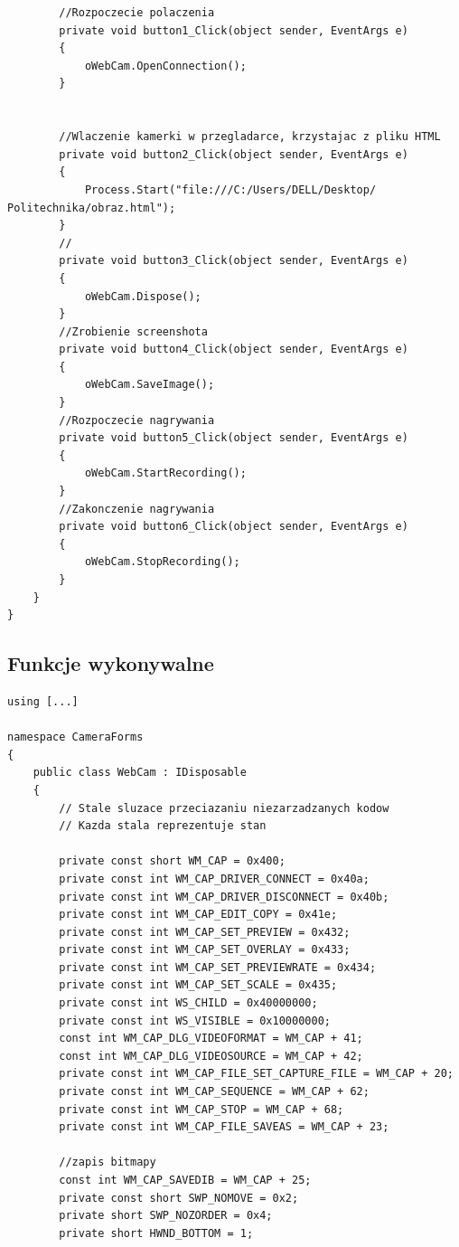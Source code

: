 \documentclass[12pt,a4paper,notitlepage]{report}
\begin{document}
\begin{adjustwidth}{0pt}{-50pt}
\begin{lstlisting}
        //Rozpoczecie polaczenia
        private void button1_Click(object sender, EventArgs e)
        {
            oWebCam.OpenConnection();
        }
        
        
        //Wlaczenie kamerki w przegladarce, krzystajac z pliku HTML
        private void button2_Click(object sender, EventArgs e)
        {
            Process.Start("file:///C:/Users/DELL/Desktop/ Politechnika/obraz.html");
        }
        //
        private void button3_Click(object sender, EventArgs e)
        {
            oWebCam.Dispose();
        }
        //Zrobienie screenshota
        private void button4_Click(object sender, EventArgs e)
        {
            oWebCam.SaveImage();
        }
        //Rozpoczecie nagrywania
        private void button5_Click(object sender, EventArgs e)
        {
            oWebCam.StartRecording();
        }
        //Zakonczenie nagrywania
        private void button6_Click(object sender, EventArgs e)
        {
            oWebCam.StopRecording();
        }
    }
}
\end{lstlisting}
\subsection{Funkcje wykonywalne}
\begin{lstlisting}
using [...]

namespace CameraForms
{
    public class WebCam : IDisposable
    {
        // Stale sluzace przeciazaniu niezarzadzanych kodow
        // Kazda stala reprezentuje stan

        private const short WM_CAP = 0x400;
        private const int WM_CAP_DRIVER_CONNECT = 0x40a;
        private const int WM_CAP_DRIVER_DISCONNECT = 0x40b;
        private const int WM_CAP_EDIT_COPY = 0x41e;
        private const int WM_CAP_SET_PREVIEW = 0x432;
        private const int WM_CAP_SET_OVERLAY = 0x433;
        private const int WM_CAP_SET_PREVIEWRATE = 0x434;
        private const int WM_CAP_SET_SCALE = 0x435;
        private const int WS_CHILD = 0x40000000;
        private const int WS_VISIBLE = 0x10000000;
        const int WM_CAP_DLG_VIDEOFORMAT = WM_CAP + 41;
        const int WM_CAP_DLG_VIDEOSOURCE = WM_CAP + 42;
        private const int WM_CAP_FILE_SET_CAPTURE_FILE = WM_CAP + 20;
        private const int WM_CAP_SEQUENCE = WM_CAP + 62;
        private const int WM_CAP_STOP = WM_CAP + 68;
        private const int WM_CAP_FILE_SAVEAS = WM_CAP + 23;

        //zapis bitmapy
        const int WM_CAP_SAVEDIB = WM_CAP + 25;
        private const short SWP_NOMOVE = 0x2;
        private short SWP_NOZORDER = 0x4;
        private short HWND_BOTTOM = 1;


\end{lstlisting}
\end{adjustwidth}
\end{document}
